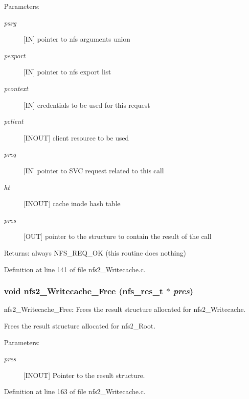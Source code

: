 \begin{Desc}
\item[Parameters:]
\begin{description}
\item[{\em parg}][IN] pointer to nfs arguments union \item[{\em pexport}][IN] pointer to nfs export list \item[{\em pcontext}][IN] credentials to be used for this request \item[{\em pclient}][INOUT] client resource to be used \item[{\em preq}][IN] pointer to SVC request related to this call \item[{\em ht}][INOUT] cache inode hash table \item[{\em pres}][OUT] pointer to the structure to contain the result of the call\end{description}
\end{Desc}
\begin{Desc}
\item[Returns:]always NFS\_\-REQ\_\-OK (this routine does nothing) \end{Desc}


Definition at line 141 of file nfs2\_\-Writecache.c.
\subsubsection{\setlength{\rightskip}{0pt plus 5cm}void nfs2\_\-Writecache\_\-Free (nfs\_\-res\_\-t $\ast$ {\em pres})}\label{nfs2__Writecache_8c_a1}


nfs2\_\-Writecache\_\-Free: Frees the result structure allocated for nfs2\_\-Writecache.

Frees the result structure allocated for nfs2\_\-Root.

\begin{Desc}
\item[Parameters:]
\begin{description}
\item[{\em pres}][INOUT] Pointer to the result structure. \end{description}
\end{Desc}


Definition at line 163 of file nfs2\_\-Writecache.c.